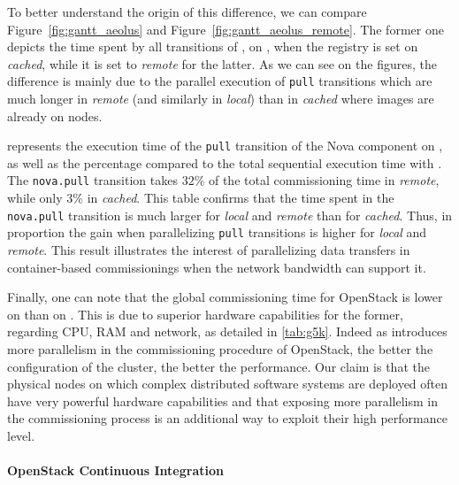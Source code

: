 To better understand the origin of this difference, we can compare
Figure~\ref{fig:gantt_aeolus} and
Figure~\ref{fig:gantt_aeolus_remote}. The former one depicts the time
spent by all transitions of \aeoass, on \ecotype, when the \docker
registry is set on \emph{cached}, while it is set to \emph{remote} for
the latter. As we can see on the figures, the difference is mainly due
to the parallel execution of \texttt{pull} transitions which are much
longer in \emph{remote} (and similarly in \emph{local}) than in
\emph{cached} where images are already on nodes.

 represents the execution time of the \texttt{pull}
transition of the Nova component on \ecotype, as well as the
percentage compared to the total sequential execution time with
\ansass. The \texttt{nova.pull} transition takes $32\%$ of the total
commissioning time in \emph{remote}, while only $3\%$ in
\emph{cached}. This table confirms that the time spent in the
\texttt{nova.pull} transition is much larger for \emph{local} and
\emph{remote} than for \emph{cached}. Thus, in proportion the gain
when parallelizing \texttt{pull} transitions is higher for
\emph{local} and \emph{remote}. This result illustrates the interest
of parallelizing data transfers in container-based commissionings when
the network bandwidth can support it.

Finally, one can note that the global commissioning time for OpenStack
is lower on \ecotype than on \nova. This is due to superior hardware
capabilities for the former, regarding CPU, RAM and network, as
detailed in \cref{tab:g5k}. Indeed as \mad introduces more parallelism
in the commissioning procedure of OpenStack, the better the
configuration of the cluster, the better the performance. Our claim is
that the physical nodes on which complex distributed software systems
are deployed often have very powerful hardware capabilities and that
exposing more parallelism in the commissioning process is an
additional way to exploit their high performance level.


\paragraph{OpenStack Continuous Integration}

